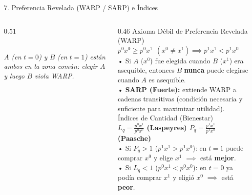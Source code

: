 \documentclass[aspectratio=169, 10pt]{beamer}
\begin{document}
\begin{frame}{7. Preferencia Revelada (WARP / SARP) e Índices}
\begin{columns}[T]
\begin{column}{0.51\textwidth}
\\[2pt]
      {\scriptsize\color{grisTexto}\textit{\(A\) (en \(t=0\)) y \(B\) (en \(t=1\)) están ambos en la zona común: elegir \(A\) y luego \(B\) viola WARP.}}
    \end{column}

    \begin{column}{0.46\textwidth}
      {\scriptsize\color{grisTexto}Axioma Débil de Preferencia Revelada (WARP)}\\[1pt]
      {\normalsize\color{rojoAcento}\textbf{\(p^0 x^0 \ge p^0 x^1 \ \ (x^0 \neq x^1) \implies p^1 x^1 < p^1 x^0\)}}\\[4pt]
      {\scriptsize
        • Si \(A\) (\(x^0\)) fue elegida cuando \(B\) (\(x^1\)) era asequible, entonces \(B\) \textbf{nunca} puede elegirse cuando \(A\) es asequible.\\
        • \textbf{SARP (Fuerte):} extiende WARP a cadenas transitivas (condición necesaria y suficiente para maximizar utilidad).\\[6pt]
      }
      {\scriptsize\color{grisTexto}Índices de Cantidad (Bienestar)}\\[1pt]
      {\small\color{verdeAcento}\textbf{\(L_q = \frac{p^0 x^1}{p^0 x^0}\) {\tiny(Laspeyres)} \quad \(P_q = \frac{p^1 x^1}{p^1 x^0}\) {\tiny(Paasche)}}}\\[4pt]
      {\scriptsize
        • Si \(P_q > 1\) (\(p^1 x^1 > p^1 x^0\)): en \(t=1\) puede comprar \(x^0\) y elige \(x^1\) \(\implies\) está \textbf{mejor}.\\
        • Si \(L_q < 1\) (\(p^0 x^1 < p^0 x^0\)): en \(t=0\) ya podía comprar \(x^1\) y eligió \(x^0\) \(\implies\) está \textbf{peor}.
      }
    \end{column}
  \end{columns}

\end{frame}
\end{document}
